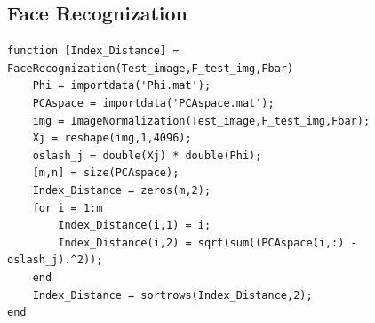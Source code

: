 \documentclass[]{article}
\begin{document}
\subsection*{Face Recognization}
\begin{verbatim}
function [Index_Distance] = FaceRecognization(Test_image,F_test_img,Fbar)
    Phi = importdata('Phi.mat');
    PCAspace = importdata('PCAspace.mat');
    img = ImageNormalization(Test_image,F_test_img,Fbar);
    Xj = reshape(img,1,4096);
    oslash_j = double(Xj) * double(Phi);
    [m,n] = size(PCAspace);
    Index_Distance = zeros(m,2);
    for i = 1:m
        Index_Distance(i,1) = i;
        Index_Distance(i,2) = sqrt(sum((PCAspace(i,:) - oslash_j).^2));
    end
    Index_Distance = sortrows(Index_Distance,2);
end
\end{verbatim}
\end{document}
